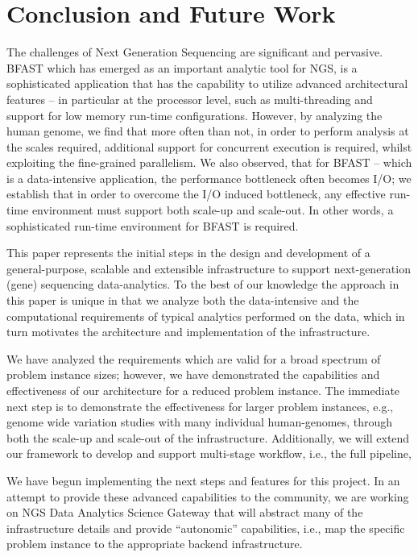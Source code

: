 \documentclass{cpeauth}
\begin{document}
\section{Conclusion and Future Work}

The challenges of Next Generation Sequencing are significant
and pervasive.
BFAST which has emerged as an important analytic tool for NGS, is  a sophisticated application that has the
capability to utilize advanced architectural features -- in particular
at the processor level, such as multi-threading and support for low
memory run-time configurations. However, by analyzing the human
genome, we find that more often than not, in order to perform analysis
at the scales required, additional support for concurrent execution is
required, whilst exploiting the fine-grained parallelism. We also
observed, that for BFAST -- which is a data-intensive application,
the performance bottleneck often becomes I/O; we establish that in
order to overcome the I/O induced bottleneck, any effective run-time
environment must support both scale-up and scale-out. In other words,
a sophisticated run-time environment for BFAST is required.

This paper represents the initial steps in the design and development
of a general-purpose, scalable and extensible infrastructure to
support next-generation (gene) sequencing data-analytics. To the best
of our knowledge the approach in this paper is unique in that we
analyze both the data-intensive and the computational requirements of
typical analytics performed on the data, which in turn motivates the
architecture and implementation of the infrastructure. 

We have analyzed the requirements which are valid for a broad spectrum
of problem instance sizes; however, we have demonstrated the
capabilities and effectiveness of our architecture for a reduced
problem instance. The immediate next step is to demonstrate the
effectiveness for larger problem instances, e.g., genome wide variation studies with many individual human-genomes,
through both the scale-up and scale-out of the infrastructure.
Additionally, we will extend our framework to develop and support
multi-stage workflow, i.e., the full pipeline,
 
We have begun implementing the next steps and features for this
project. In an attempt to provide these advanced capabilities to the
community, we are working on NGS Data Analytics Science Gateway that
will abstract many of the infrastructure details and provide
``autonomic'' capabilities, i.e., map the specific problem instance to
the appropriate backend infrastructure.
\end{document}
